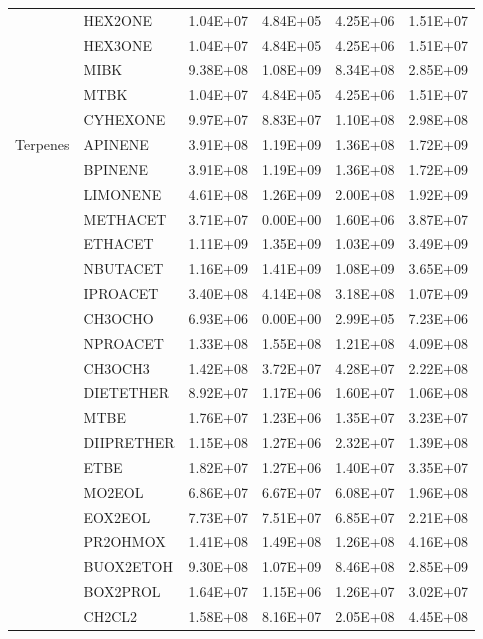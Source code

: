 \begin{longtable}{llllll}
	 & HEX2ONE & 1.04E+07 & 4.84E+05 & 4.25E+06 & 1.51E+07 \\
	 & HEX3ONE & 1.04E+07 & 4.84E+05 & 4.25E+06 & 1.51E+07 \\
	 & MIBK & 9.38E+08 & 1.08E+09 & 8.34E+08 & 2.85E+09 \\
	 & MTBK & 1.04E+07 & 4.84E+05 & 4.25E+06 & 1.51E+07 \\
	 & CYHEXONE & 9.97E+07 & 8.83E+07 & 1.10E+08 & 2.98E+08 \\
	\hline \multirow{3}{*}{Terpenes} & APINENE & 3.91E+08 & 1.19E+09 & 1.36E+08 & 1.72E+09 \\
	 & BPINENE & 3.91E+08 & 1.19E+09 & 1.36E+08 & 1.72E+09 \\
	 & LIMONENE & 4.61E+08 & 1.26E+09 & 2.00E+08 & 1.92E+09 \\
	\hline \parbox[t]{2mm}{} & METHACET & 3.71E+07 & 0.00E+00 & 1.60E+06 & 3.87E+07 \\*
	 & ETHACET & 1.11E+09 & 1.35E+09 & 1.03E+09 & 3.49E+09 \\*
	 & NBUTACET & 1.16E+09 & 1.41E+09 & 1.08E+09 & 3.65E+09 \\*
	 & IPROACET & 3.40E+08 & 4.14E+08 & 3.18E+08 & 1.07E+09 \\*
	 & CH3OCHO & 6.93E+06 & 0.00E+00 & 2.99E+05 & 7.23E+06 \\*
	 & NPROACET & 1.33E+08 & 1.55E+08 & 1.21E+08 & 4.09E+08 \\*
	\hline \parbox[t]{2mm}{} & CH3OCH3 & 1.42E+08 & 3.72E+07 & 4.28E+07 & 2.22E+08 \\
	 & DIETETHER & 8.92E+07 & 1.17E+06 & 1.60E+07 & 1.06E+08 \\
	 & MTBE & 1.76E+07 & 1.23E+06 & 1.35E+07 & 3.23E+07 \\
	 & DIIPRETHER & 1.15E+08 & 1.27E+06 & 2.32E+07 & 1.39E+08 \\
	 & ETBE & 1.82E+07 & 1.27E+06 & 1.40E+07 & 3.35E+07 \\
	 & MO2EOL & 6.86E+07 & 6.67E+07 & 6.08E+07 & 1.96E+08 \\
	 & EOX2EOL & 7.73E+07 & 7.51E+07 & 6.85E+07 & 2.21E+08 \\
	 & PR2OHMOX & 1.41E+08 & 1.49E+08 & 1.26E+08 & 4.16E+08 \\
	 & BUOX2ETOH & 9.30E+08 & 1.07E+09 & 8.46E+08 & 2.85E+09 \\
	 & BOX2PROL & 1.64E+07 & 1.15E+06 & 1.26E+07 & 3.02E+07 \\
	\hline \parbox[t]{2mm}{} & CH2CL2 & 1.58E+08 & 8.16E+07 & 2.05E+08 & 4.45E+08 \\

\end{longtable}
